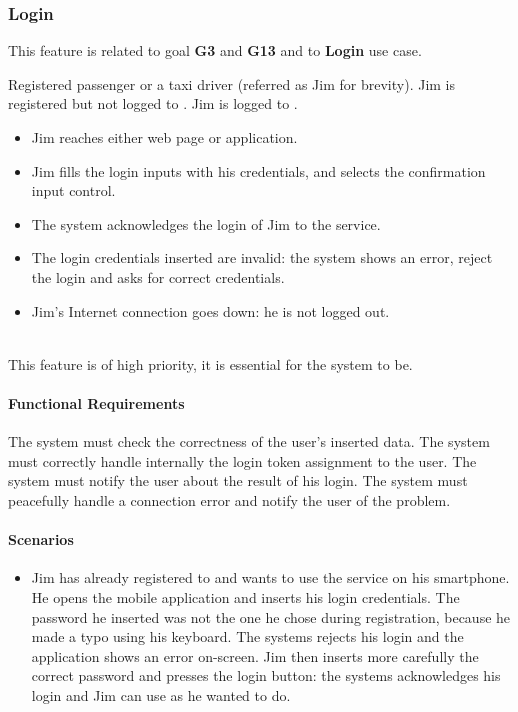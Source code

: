 \subsubsection{Login}
This feature is related to goal \textbf{G3} and \textbf{G13} and to \textbf{Login} use case.
\begin{itemize}
	 Registered passenger or a taxi driver (referred as Jim for brevity).
	 Jim is registered but not logged to \myTaxiService{}.
	 Jim is logged to \myTaxiService{}.
	\begin{itemize}
		\item Jim reaches either \myTaxiService{} web page or application.
		\item Jim fills the login inputs with his credentials, and selects the confirmation input control.
		\item The system acknowledges the login of Jim to the service.
	\end{itemize}
	\begin{itemize}
		\item The login credentials inserted are invalid: the system shows an error, reject the login and asks for correct credentials.
		\item Jim's Internet connection goes down: he is not logged out.
	\end{itemize}
\end{itemize}
\\
This feature is of high priority, it is essential for the system to be.
\paragraph{Functional Requirements}
\begin{itemize}
	 The system must check the correctness of the user's inserted data.
	 The system must correctly handle internally the login token assignment to the user.
	 The system must notify the user about the result of his login.
	 The system must peacefully handle a connection error and notify the user of the problem.
\end{itemize}
\paragraph{Scenarios}
\begin{itemize}
	\item Jim has already registered to \myTaxiService{} and wants to use the service on his smartphone.
	He opens the mobile application and inserts his login credentials.
	The password he inserted was not the one he chose during registration, because he made a typo using his keyboard.
	The systems rejects his login and the application shows an error on-screen.
	Jim then inserts more carefully the correct password and presses the login button: the systems acknowledges his login and Jim can use \myTaxiService{} as he wanted to do.
\end{itemize}
